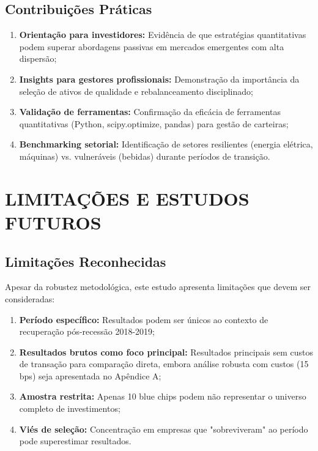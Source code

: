 \subsection{Contribuições Práticas}

\begin{enumerate}
    \item \textbf{Orientação para investidores:} Evidência de que estratégias quantitativas podem superar abordagens passivas em mercados emergentes com alta dispersão;
    
    \item \textbf{Insights para gestores profissionais:} Demonstração da importância da seleção de ativos de qualidade e rebalanceamento disciplinado;
    
    \item \textbf{Validação de ferramentas:} Confirmação da eficácia de ferramentas quantitativas (Python, scipy.optimize, pandas) para gestão de carteiras;
    
    \item \textbf{Benchmarking setorial:} Identificação de setores resilientes (energia elétrica, máquinas) vs. vulneráveis (bebidas) durante períodos de transição.
\end{enumerate}

\section{LIMITAÇÕES E ESTUDOS FUTUROS}

\subsection{Limitações Reconhecidas}

Apesar da robustez metodológica, este estudo apresenta limitações que devem ser consideradas:

\begin{enumerate}
    \item \textbf{Período específico:} Resultados podem ser únicos ao contexto de recuperação pós-recessão 2018-2019;
    
    \item \textbf{Resultados brutos como foco principal:} Resultados principais sem custos de transação para comparação direta, embora análise robusta com custos (15 bps) seja apresentada no Apêndice A;
    
    \item \textbf{Amostra restrita:} Apenas 10 blue chips podem não representar o universo completo de investimentos;
    
    \item \textbf{Viés de seleção:} Concentração em empresas que "sobreviveram" ao período pode superestimar resultados.
\end{enumerate}

